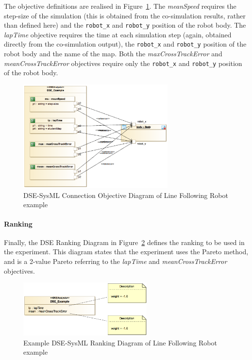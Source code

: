 The objective definitions are realised in Figure~\ref{fig:dse_lfr_obj2}. The \emph{meanSpeed} requires the step-size of the simulation (this is obtained from the co-simulation results, rather than defined here) and the \texttt{robot\_x} and \texttt{robot\_y} position of the robot body. The \emph{lapTime} objective requires the time at each simulation step (again, obtained directly from the co-simulation output), the \texttt{robot\_x} and \texttt{robot\_y} position of the robot body and the name of the map. Both the \emph{maxCrossTrackError} and \emph{meanCrossTrackError} objectives require only the \texttt{robot\_x} and \texttt{robot\_y} position of the robot body.

\begin{figure}[htbp]
	\centering
	\includegraphics[width=0.7\textwidth]{figures/LFR_DSE_Obj2}
\caption{DSE-SysML Connection Objective Diagram of Line Following Robot example}
\label{fig:dse_lfr_obj2}
\end{figure}

\paragraph{Ranking} Finally, the DSE Ranking Diagram in Figure~\ref{fig:dse_lfr_rank} defines the ranking to be used in the experiment. This diagram states that the experiment uses the Pareto method, and is a 2-value Pareto referring to the \emph{lapTime} and \emph{meanCrossTrackError} objectives.

\begin{figure}[htbp]
	\centering
	\includegraphics[width=0.6\textwidth]{figures/LFR_DSE_Rank}
\caption{Example DSE-SysML Ranking Diagram of Line Following Robot example}
\label{fig:dse_lfr_rank}
\end{figure}

